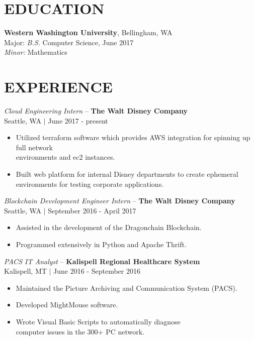 \documentclass[line,margin]{res}
\begin{document}
\address{alex@alex-benedetto.com $|$ github.com/wolfpack94}

\begin{resume}

\section{EDUCATION}
	{\bf Western Washington University}, Bellingham, WA \\
	Major: {\sl B.S.} Computer Science, {\small June 2017}\\
	{\sl Minor:} Mathematics
\section{EXPERIENCE}
	{\sl Cloud Engineering Intern} -- {\bf The Walt Disney Company}\\ 
	{\footnotesize Seattle, WA $|$ June 2017 - present}\\
	\begin{itemize} \itemsep -2pt
		\item Utilized terraform software which provides AWS integration for spinning up full network \\environments and ec2 instances.
		\item Built web platform for internal Disney departments to create ephemeral environments for testing corporate applications.
	\end{itemize}
	{\sl Blockchain Development Engineer Intern} -- {\bf The Walt Disney Company}\\ 
	{\footnotesize Seattle, WA $|$ September 2016 - April 2017}\\
	\begin{itemize} \itemsep -2pt
		\item Assisted in the development of the Dragonchain Blockchain.
		\item Programmed extensively in Python and Apache Thrift.
	\end{itemize}
	{\sl PACS IT Analyst} -- {\bf Kalispell Regional Healthcare System} \\
	{\footnotesize Kalispell, MT $|$ June 2016 - September 2016}\\
	\begin{itemize} \itemsep -2pt
		\item Maintained the Picture Archiving and Communication System (PACS).
		\item Developed MightMouse software.
		\item Wrote Visual Basic Scripts to automatically diagnose \\computer issues in the 300+ PC network.

\end{itemize}
\end{resume}
\end{document}
